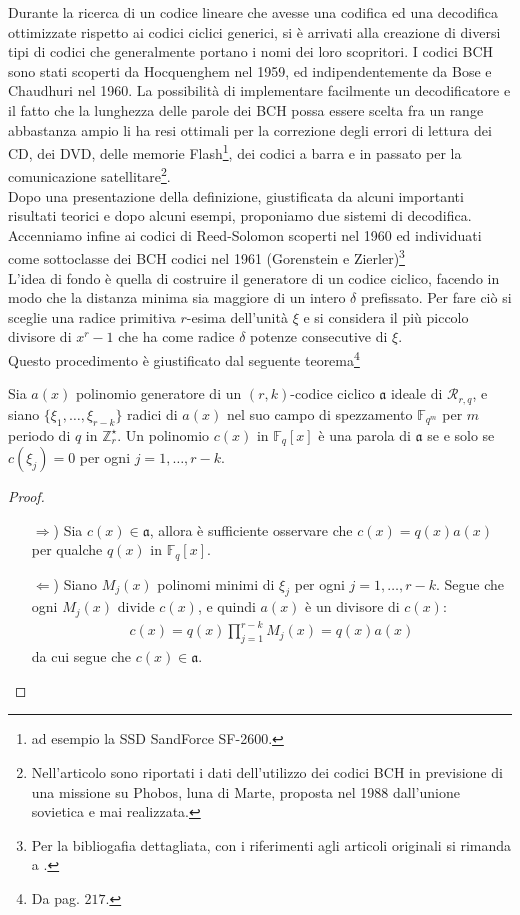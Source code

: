 Durante la ricerca di un codice lineare che avesse una codifica ed una decodifica ottimizzate rispetto ai codici ciclici generici, si è arrivati alla creazione di diversi tipi di codici che generalmente portano i nomi dei loro scopritori. I codici BCH sono stati scoperti da Hocquenghem nel 1959, ed indipendentemente da Bose e Chaudhuri nel 1960.
La possibilità di implementare facilmente un decodificatore e il fatto che la lunghezza delle parole dei BCH possa essere scelta fra un range abbastanza ampio li ha resi ottimali per la correzione degli errori di lettura dei CD, dei DVD, delle memorie Flash\footnote{ad esempio la SSD SandForce SF-2600.}, dei codici a barra e in passato per la comunicazione satellitare\footnote{Nell'articolo \cite{cherung} sono riportati i dati dell'utilizzo dei codici BCH in previsione di una missione su Phobos, luna di Marte, proposta nel 1988 dall'unione sovietica e mai realizzata.}.\\
Dopo una presentazione della definizione, giustificata da alcuni importanti risultati teorici e dopo alcuni esempi, proponiamo due sistemi di decodifica. Accenniamo infine ai codici di Reed-Solomon scoperti nel 1960 ed individuati come sottoclasse dei BCH codici nel 1961 (Gorenstein e Zierler)\footnote{Per la bibliogafia dettagliata, con i riferimenti agli articoli originali si rimanda a \cite{blahut}.} \\
L'idea di fondo è quella di costruire il generatore di un codice ciclico, facendo in modo che la distanza minima sia maggiore di un intero $\delta$ prefissato. Per fare ciò si sceglie una radice primitiva $r$-esima dell'unità $\xi$ e si considera il più piccolo divisore di $x^r-1$ che ha come radice $\delta$ potenze consecutive di $\xi$.\\
Questo procedimento è giustificato dal seguente teorema\footnote{Da \cite{berardi} pag. $217$.}
\begin{teorema}
   Sia $a(x)$ polinomio generatore di un $(r,k)$-codice ciclico $\mathfrak{a}$ ideale di $\mathcal{R}_{r,q}$, e siano $\lbrace \xi_{1}, \dots,\xi_{r-k} \rbrace $ radici di $a(x)$ nel suo campo di spezzamento $\mathbb{F}_{q^m}$ per $m$ periodo di $q$ in $\mathbb{Z}_{r}^{\star}$.
   Un polinomio $c(x)$ in $\mathbb{F}_{q}[x]$ è una parola di $\mathfrak{a}$ se e solo se $c(\xi_{j}) = 0$ per ogni $j = 1, \dots , r-k$.
\end{teorema}
\begin{proof}
  \begin{itemize}
   \item[$\Rightarrow$)] Sia $c(x) \in \mathfrak{a}$, allora è sufficiente osservare che $c(x) = q(x)a(x)$ per qualche $q(x)$ in $\mathbb{F}_{q}[x]$.
   \item[$\Leftarrow$)] Siano $M_{j}(x)$ polinomi minimi di $\xi_{j}$ per ogni $j = 1, \dots , r-k$. Segue che ogni $M_{j}(x)$ divide $c(x)$, e quindi $a(x)$ è un divisore di $c(x)$:
   \begin{align*}
     c(x) = q(x) \prod_{j=1}^{r-k}M_{j}(x) =  q(x)a(x)
   \end{align*}
   da cui segue che $c(x) \in \mathfrak{a}$.
\end{itemize}
\end{proof}
